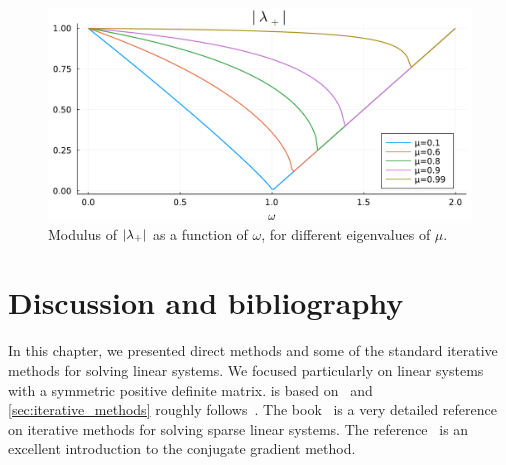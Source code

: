 \begin{figure}[ht]
    \centering
    \includegraphics[width=0.8\linewidth]{figures/optimal_omega.pdf}
    \caption{Modulus of $\lvert\lambda_+\rvert$ as a function of $\omega$,
    for different eigenvalues of $\mu$.}
    \label{fig:modulus_lambdas}
\end{figure}

\section{Discussion and bibliography}%

In this chapter,
we presented direct methods and some of the standard iterative methods for solving linear systems.
We focused particularly on linear systems with a symmetric positive definite matrix.
 is based on~\cite{MR2265914,Vuik}
and \cref{sec:iterative_methods} roughly follows~\cite[Chapter 2]{VanDooren}.
The book~\cite{MR1990645} is a very detailed reference on iterative methods for solving sparse linear systems.
The reference~\cite{shewchuk1994introduction} is an excellent introduction to the conjugate gradient method.
